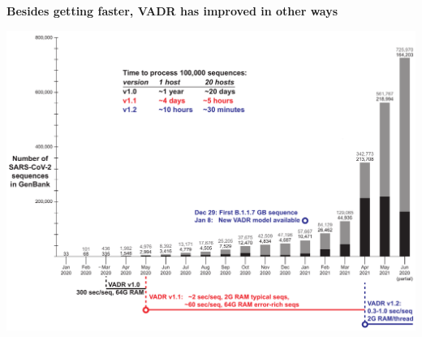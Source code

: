 \documentclass[landscape]{slides}
\begin{document}
%
%
\begin{slide}
\begin{center}
\textbf{Besides getting faster, VADR has improved in other ways}

\includegraphics[width=10.25in]{figs/sars-counts-jan2020-jun2021-slide4}

\end{center}

\vfill
\end{slide}
\end{document}
